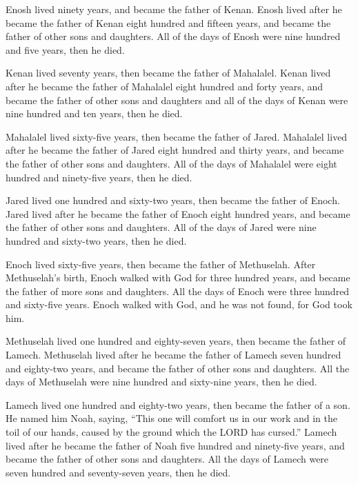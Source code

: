  Enosh lived ninety years, and became the father of Kenan.
 Enosh lived after he became the father of Kenan eight
hundred and fifteen years, and became the father of other sons and
daughters.  All of the days of Enosh were nine hundred
and five years, then he died.

 Kenan lived seventy years, then became the father of
Mahalalel.  Kenan lived after he became the father of
Mahalalel eight hundred and forty years, and became the father of other
sons and daughters  and all of the days of Kenan were
nine hundred and ten years, then he died.

 Mahalalel lived sixty-five years, then became the father
of Jared.  Mahalalel lived after he became the father of
Jared eight hundred and thirty years, and became the father of other
sons and daughters.  All of the days of Mahalalel were
eight hundred and ninety-five years, then he died.

 Jared lived one hundred and sixty-two years, then became
the father of Enoch.  Jared lived after he became the
father of Enoch eight hundred years, and became the father of other sons
and daughters.  All of the days of Jared were nine
hundred and sixty-two years, then he died.

 Enoch lived sixty-five years, then became the father of
Methuselah.  After Methuselah's birth, Enoch walked with
God for three hundred years, and became the father of more sons and
daughters.  All the days of Enoch were three hundred and
sixty-five years.  Enoch walked with God, and he was not
found, for God took him.

 Methuselah lived one hundred and eighty-seven years,
then became the father of Lamech.  Methuselah lived after
he became the father of Lamech seven hundred and eighty-two years, and
became the father of other sons and daughters.  All the
days of Methuselah were nine hundred and sixty-nine years, then he died.

 Lamech lived one hundred and eighty-two years, then
became the father of a son.  He named him Noah, saying,
``This one will comfort us in our work and in the toil of our hands,
caused by the ground which the LORD has cursed.''  Lamech
lived after he became the father of Noah five hundred and ninety-five
years, and became the father of other sons and daughters.
 All the days of Lamech were seven hundred and
seventy-seven years, then he died.

